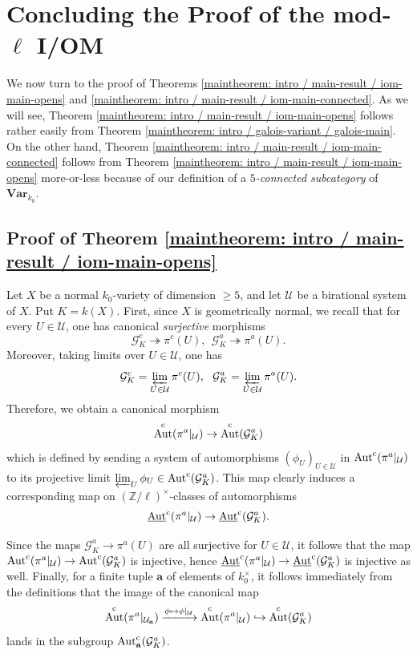 \documentclass[11pt]{amsart}
\theoremstyle{definition}
\theoremstyle{remark}
\numberwithin{equation}{section}
\DeclareMathOperator{\Aut}{Aut}
\newcommand{\Z}{\mathbb{Z}}
\newcommand{\Gc}{\mathcal{G}}
\newcommand{\Ucal}{\mathcal{U}}
\newcommand{\abf}{\mathbf{a}}
\newcommand{\Autc}{\Aut^{\rm c}}
\newcommand{\UAutc}{\underline{\Aut}^{\rm c}}
\newcommand{\Var}{\mathbf{Var}}
\begin{document}
\section{Concluding the Proof of the mod-$\ell$ I/OM}
\label{section: finalproof}


We now turn to the proof of Theorems \ref{maintheorem: intro / main-result / iom-main-opens} and \ref{maintheorem: intro / main-result / iom-main-connected}.
As we will see, Theorem \ref{maintheorem: intro / main-result / iom-main-opens} follows rather easily from Theorem \ref{maintheorem: intro / galois-variant / galois-main}.
On the other hand, Theorem \ref{maintheorem: intro / main-result / iom-main-connected} follows from Theorem \ref{maintheorem: intro / main-result / iom-main-opens} more-or-less because of our definition of a \emph{$5$-connected subcategory} of $\Var_{k_0}$.

\subsection{Proof of Theorem \ref{maintheorem: intro / main-result / iom-main-opens}}
\label{subsection: finalproof / ion-main-opens}

Let $X$ be a normal $k_0$-variety of dimension $\geq 5$, and let $\Ucal$ be a birational system of $X$.
Put $K = k(X)$.
First, since $X$ is geometrically normal, we recall that for every $U \in \Ucal$, one has canonical \emph{surjective} morphisms
\[ \Gc_K^c \twoheadrightarrow \pi^c(U), \ \ \Gc_K^a \twoheadrightarrow \pi^a(U). \]
Moreover, taking limits over $U \in \Ucal$, one has
\[ \Gc_K^c = \varprojlim_{U \in \Ucal} \pi^c(U), \ \ \Gc_K^a = \varprojlim_{U \in \Ucal} \pi^a(U). \]
Therefore, we obtain a canonical morphism
\[ \Autc(\pi^a|_\Ucal) \rightarrow \Autc(\Gc_K^a) \]
which is defined by sending a system of automorphisms $(\phi_U)_{U \in \Ucal}$ in $\Autc(\pi^a|_\Ucal)$ to its projective limit $\varprojlim_U \phi_U \in \Autc(\Gc_K^a)$.
This map clearly induces a corresponding map on $(\Z/\ell)^\times$-classes of automorphisms
\[ \UAutc(\pi^a|_\Ucal) \rightarrow \UAutc(\Gc_K^a). \]

Since the maps $\Gc_K^a \rightarrow \pi^a(U)$ are all surjective for $U \in \Ucal$, it follows that the map $\Autc(\pi^a|_\Ucal) \rightarrow \Autc(\Gc_K^a)$ is injective, hence $\UAutc(\pi^a|_\Ucal) \rightarrow \UAutc(\Gc_K^a)$ is injective as well.
Finally, for a finite tuple $\abf$ of elements of $k_0^\times$, it follows immediately from the definitions that the image of the canonical map
\[ \Autc(\pi^a|_{\Ucal_\abf}) \xrightarrow{\phi \mapsto \phi|_\Ucal} \Autc(\pi^a|_\Ucal) \hookrightarrow \Autc(\Gc_K^a)\]
lands in the subgroup $\Autc_\abf(\Gc_K^a)$.
\end{document}
